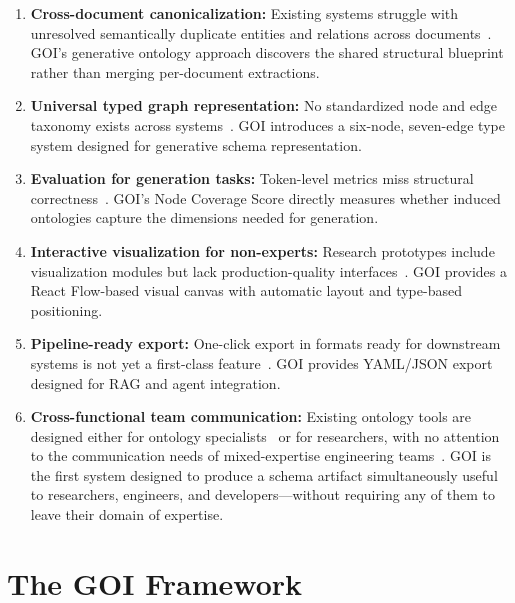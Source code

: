 \documentclass[runningheads,a4paper]{llncs}
\begin{document}
\begin{enumerate}[leftmargin=*]
  \item \textbf{Cross-document canonicalization:} Existing systems
    struggle with unresolved semantically duplicate entities and
    relations across documents~\cite{chen2024itext2kg,wang2024autoclusre,zhang2024edc}.
    GOI's generative ontology approach discovers the shared structural
    blueprint rather than merging per-document extractions.
  \item \textbf{Universal typed graph representation:} No standardized
    node and edge taxonomy exists across
    systems~\cite{lo2024endtoend,kumar2024taxonomic}. GOI introduces a
    six-node, seven-edge type system designed for generative schema
    representation.
  \item \textbf{Evaluation for generation tasks:} Token-level metrics
    miss structural correctness~\cite{lo2024endtoend}. GOI's Node
    Coverage Score directly measures whether induced ontologies capture
    the dimensions needed for generation.
  \item \textbf{Interactive visualization for non-experts:} Research
    prototypes include visualization modules but lack production-quality
    interfaces~\cite{chen2024itext2kg,thompson2024ontokgen,rodriguez2023kgraphx}.
    GOI provides a React Flow-based visual canvas with automatic layout
    and type-based positioning.
  \item \textbf{Pipeline-ready export:} One-click export in formats
    ready for downstream systems is not yet a first-class
    feature~\cite{chen2024itext2kg,foster2023distributed}. GOI provides
    YAML/JSON export designed for RAG and agent integration.
  \item \textbf{Cross-functional team communication:} Existing ontology
    tools are designed either for ontology
    specialists~\cite{musen2015protege} or for researchers, with no
    attention to the communication needs of mixed-expertise engineering
    teams~\cite{rodriguez2023kgraphx,patel2023ontospread,davis2024schemex}.
    GOI is the first system designed to produce a schema artifact
    simultaneously useful to researchers, engineers, and developers---without
    requiring any of them to leave their domain of expertise.
\end{enumerate}

\section{The GOI Framework}
\label{sec:framework}
\end{document}
